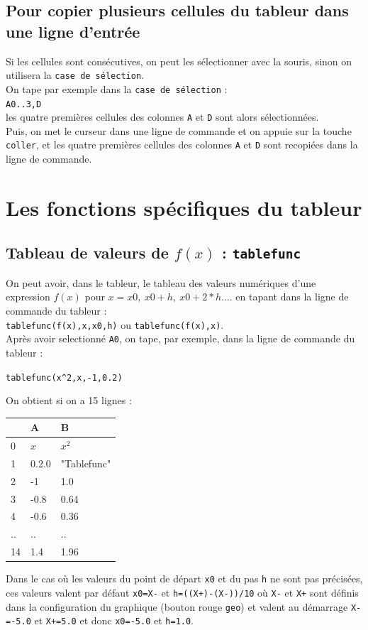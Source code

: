 \documentclass[a4paper,11pt]{book}
\begin{document}
\subsection{Pour copier plusieurs cellules du tableur dans une ligne d'entr\'ee}
Si les cellules sont cons\'ecutives, on peut les s\'electionner avec la 
souris, sinon on utilisera la {\tt case de s\'election}.\\
On tape par exemple dans la {\tt case de s\'election} :\\
{\tt A0..3,D}\\
les quatre premi\`eres cellules des colonnes {\tt A} et {\tt D} sont alors 
s\'electionn\'ees.\\
Puis, on met le curseur dans une ligne de commande et on appuie sur la touche 
{\tt coller}, et les quatre 
premi\`eres cellules des colonnes {\tt A} et {\tt D} sont recopi\'ees dans la
ligne de commande.

\section{Les fonctions sp\'ecifiques du tableur}
\subsection{Tableau de valeurs de  $f(x)$ : {\tt tablefunc}}\label{sec:tablefunc}
On peut avoir, dans le tableur, le tableau des valeurs num\'eriques d'une 
expression $f(x)$ pour $x=x0,\ x0+h,\ x0+2*h....$ en tapant dans la ligne 
de commande du tableur :\\
{\tt tablefunc(f(x),x,x0,h)} ou  {\tt tablefunc(f(x),x)}.\\
Apr\`es avoir selectionn\'e {\tt A0}, on tape, par exemple, dans la ligne de 
commande du tableur :\\
\begin{center}{\tt tablefunc(x\verb|^|2,x,-1,0.2)}\end{center}
On obtient si on a 15 lignes :\\
\begin{center}{\tt \begin{tabular}{|l|l|l|}
\hline
 &A&B\\
\hline
0 & $x$ &$x^2$\\
\hline
1 &0.2.0&"Tablefunc"\\
\hline
2& -1&1.0\\
\hline
3 & -0.8 & 0.64\\
\hline
4 & -0.6 &0.36\\
\hline
.. &..&..\\
\hline
14 &1.4 &1.96\\
\hline
\end{tabular}}\end{center}
Dans le cas o\`u les valeurs du point de d\'epart {\tt x0} et du pas {\tt h} ne
sont pas pr\'ecis\'ees, ces valeurs valent par d\'efaut {\tt x0=X-} et 
{\tt h=((X+)-(X-))/10} o\`u {\tt X-} et {\tt X+} sont d\'efinis dans la 
configuration du graphique (bouton rouge {\tt geo}) et valent au d\'emarrage
{\tt X-=-5.0} et {\tt X+=5.0} et donc  {\tt x0=-5.0} et {\tt h=1.0}.\\
\end{document}
